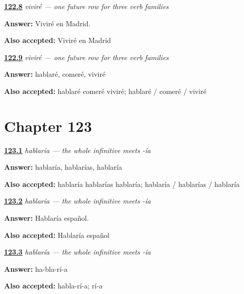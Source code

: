 \noindent\begin{minipage}[t]{\linewidth}
\raggedright
\hyperlink{review-ES-C17-vivir-futuro-madrid}{\textbf{122.8}} \emph{viviré — one future row for three verb families}\par
\small \textbf{Answer:} Viviré en Madrid.\par
\footnotesize \textbf{Also accepted:} Viviré en Madrid
\end{minipage}\par\medskip

\noindent\begin{minipage}[t]{\linewidth}
\raggedright
\hyperlink{review-ES-C17-vivir-futuro-three-yo}{\textbf{122.9}} \emph{viviré — one future row for three verb families}\par
\small \textbf{Answer:} hablaré, comeré, viviré\par
\footnotesize \textbf{Also accepted:} hablaré comeré viviré; hablaré / comeré / viviré
\end{minipage}\par\medskip

\section*{Chapter 123}

\noindent\begin{minipage}[t]{\linewidth}
\raggedright
\hyperlink{review-ES-C17-condicional-singular-forms}{\textbf{123.1}} \emph{hablaría — the whole infinitive meets -ía}\par
\small \textbf{Answer:} hablaría, hablarías, hablaría\par
\footnotesize \textbf{Also accepted:} hablaría hablarías hablaría; hablaría / hablarías / hablaría
\end{minipage}\par\medskip

\noindent\begin{minipage}[t]{\linewidth}
\raggedright
\hyperlink{review-ES-C17-condicional-hablaria-espanol}{\textbf{123.2}} \emph{hablaría — the whole infinitive meets -ía}\par
\small \textbf{Answer:} Hablaría español.\par
\footnotesize \textbf{Also accepted:} Hablaría español
\end{minipage}\par\medskip

\noindent\begin{minipage}[t]{\linewidth}
\raggedright
\hyperlink{review-ES-C17-condicional-syllables}{\textbf{123.3}} \emph{hablaría — the whole infinitive meets -ía}\par
\small \textbf{Answer:} ha-bla-rí-a\par
\footnotesize \textbf{Also accepted:} habla-rí-a; rí-a
\end{minipage}\par\medskip

